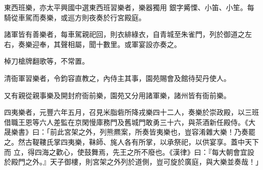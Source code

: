 \begin{pinyinscope}
 東西班樂，亦太平興國中選東西班習樂者，樂器獨用
 銀字觱慄、小笛、小笙。每騎從車駕而奏樂，或巡方則夜奏於行宮殿庭。



 諸軍皆有善樂者，每車駕親祀回，則衣緋綠衣，自青城至朱雀門，列於御道之左右，奏樂迎奉，其聲相屬，聞十數里。或軍宴設亦奏之。



 棹刀槍牌翻歌等，不常置。



 清衙軍習樂者，令鈞容直教之，內侍主其事，園苑賜會及館待契丹使人。



 又有親從親事樂及開封府衙前樂，園苑又分用諸軍樂，諸州皆有衙前樂。



 四夷樂者，元豐六年五月，召見米脂砦所降戎樂四十二人，奏樂於崇政殿，以三班借職王恩等六人差監在京閑慢庫務門及舊城門敢勇三十六，與茶酒新任殿侍。《大晟樂書》曰：「前此宮架之外，列熊羆案，所奏皆夷樂也，豈容淆雜大樂！乃奏罷之。然古鞮鞻氏掌四夷樂，靺師、旄人各有所掌，以承祭祀，以供宴享。蓋中天下而
 立，得四海之歡心，使鼓舞焉，先王之所不廢也。《漢律》曰：『每大朝會宜設於殿門之外。』天子御樓，則宮架之外列於道側，豈可旋於廣庭，與大樂並奏哉！」



\end{pinyinscope}